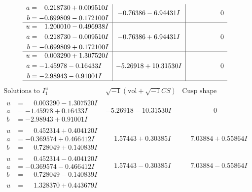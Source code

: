 \documentclass[1p]{elsarticle_modified}
\theoremstyle{definition}
\newcommand{\I}{\sqrt{-1}}
\begin{document}
$$\begin{array}{c|c|c}
\begin{aligned}
a &= \phantom{-}0.218730 + 0.009510 I \\
b &= -0.699809 - 0.172100 I\end{aligned}
 & -0.76386 - 6.94431 I & \phantom{-0.000000 } 0 \\ \hline\begin{aligned}
u &= \phantom{-}1.200010 - 0.496938 I \\
a &= \phantom{-}0.218730 - 0.009510 I \\
b &= -0.699809 + 0.172100 I\end{aligned}
 & -0.76386 + 6.94431 I & \phantom{-0.000000 } 0 \\ \hline\begin{aligned}
u &= \phantom{-}0.003290 + 1.307520 I \\
a &= -1.45978 - 0.16433 I \\
b &= -2.98943 - 0.91001 I\end{aligned}
 & -5.26918 + 10.31530 I & \phantom{-0.000000 } 0\\
 \hline 
 \end{array}$$\newpage$$\begin{array}{c|c|c}  
\text{Solutions to }I^u_{1}& \I (\text{vol} + \sqrt{-1}CS) & \text{Cusp shape}\\
 \hline 
\begin{aligned}
u &= \phantom{-}0.003290 - 1.307520 I \\
a &= -1.45978 + 0.16433 I \\
b &= -2.98943 + 0.91001 I\end{aligned}
 & -5.26918 - 10.31530 I & \phantom{-0.000000 } 0 \\ \hline\begin{aligned}
u &= \phantom{-}0.452314 + 0.404120 I \\
a &= -0.369574 + 0.466412 I \\
b &= \phantom{-}0.728049 + 0.140839 I\end{aligned}
 & \phantom{-}1.57443 + 0.30385 I & \phantom{-}7.03884 + 0.55864 I \\ \hline\begin{aligned}
u &= \phantom{-}0.452314 - 0.404120 I \\
a &= -0.369574 - 0.466412 I \\
b &= \phantom{-}0.728049 - 0.140839 I\end{aligned}
 & \phantom{-}1.57443 - 0.30385 I & \phantom{-}7.03884 - 0.55864 I \\ \hline\begin{aligned}
u &= \phantom{-}1.328370 + 0.443679 I \\

\end{aligned}
\end{array}$$
\end{document}

